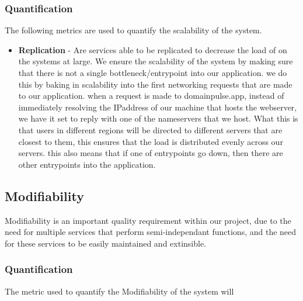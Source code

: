 \documentclass[12pt]{article}
\begin{document}
\subsubsection{Quantification}
The following metrics are used to quantify the scalability of the system.
\begin{itemize}
    \item \textbf{Replication} - Are services able to be replicated to decrease the load of on the systems at large.
          \newline We ensure the scalability of the system by making sure that there is not a single bottleneck/entrypoint into our application.
          \newline we do this by baking in scalability into the first networking requests that are made to our application. when a request is made to domainpulse.app, instead of immediately resolving the IPaddress of our machine that hosts the webserver,
          we have it set to reply with one of the nameservers that we host. What this is that users in different regions will be directed to different servers that are closest to them, this ensures that the load is distributed evenly across our servers.
          \newline this also means that if one of entrypoints go down, then there are other entrypoints into the application.
\end{itemize}

\subsection{Modifiability}
Modifiability is an important quality requirement within our project, due to the need for multiple services that perform semi-independant functions, and the need for these services to be easily maintained and extinsible.
\subsubsection{Quantification}
The metric used to quantify the Modifiability of the system will
\newpage
\end{document}
